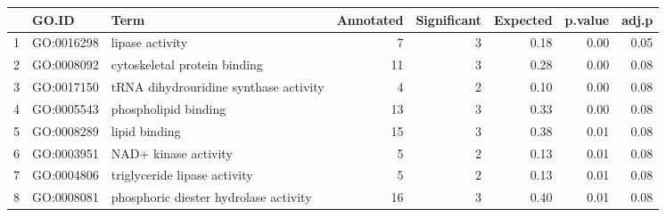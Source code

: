 \begin{table}[ht]
\centering
\begin{tabular}{rllrrrrr}
  \hline
 & GO.ID & Term & Annotated & Significant & Expected & p.value & adj.p \\ 
  \hline
1 & GO:0016298 & lipase activity &   7 &   3 & 0.18 & 0.00 & 0.05 \\ 
  2 & GO:0008092 & cytoskeletal protein binding &  11 &   3 & 0.28 & 0.00 & 0.08 \\ 
  3 & GO:0017150 & tRNA dihydrouridine synthase activity &   4 &   2 & 0.10 & 0.00 & 0.08 \\ 
  4 & GO:0005543 & phospholipid binding &  13 &   3 & 0.33 & 0.00 & 0.08 \\ 
  5 & GO:0008289 & lipid binding &  15 &   3 & 0.38 & 0.01 & 0.08 \\ 
  6 & GO:0003951 & NAD+ kinase activity &   5 &   2 & 0.13 & 0.01 & 0.08 \\ 
  7 & GO:0004806 & triglyceride lipase activity &   5 &   2 & 0.13 & 0.01 & 0.08 \\ 
  8 & GO:0008081 & phosphoric diester hydrolase activity &  16 &   3 & 0.40 & 0.01 & 0.08 \\ 
   \hline
\end{tabular}
\end{table}
